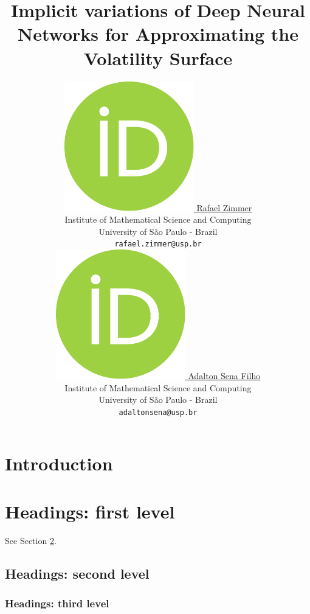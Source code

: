 \documentclass{article}
\title{Implicit variations of Deep Neural Networks for Approximating the Volatility Surface}
\author{ 
	\href{https://orcid.org/0009-0008-6064-9895}{
		\includegraphics[scale=0.06]{resources/orcid.pdf}
		\hspace{1mm}Rafael Zimmer
	}\\
	Institute of Mathematical Science and Computing\\
	University of São Paulo - Brazil \\
	\texttt{rafael.zimmer@usp.br} \\
	\And
	\href{https://orcid.org/0000-0000-0000-0000}{
		\includegraphics[scale=0.06]{resources/orcid.pdf}
		\hspace{1mm}Adalton Sena Filho
	}\\
	Institute of Mathematical Science and Computing\\
	University of São Paulo - Brazil \\
	\texttt{adaltonsena@usp.br} \\
}
\begin{document}
	\maketitle
	
	\begin{abstract}
		
	\end{abstract}
	
	
	\section{Introduction}
	\section{Headings: first level}
	\label{sec:headings}
	
	See Section \ref{sec:headings}.
	
	\subsection{Headings: second level}
	
	\subsubsection{Headings: third level}
	
	
	
\end{document}
